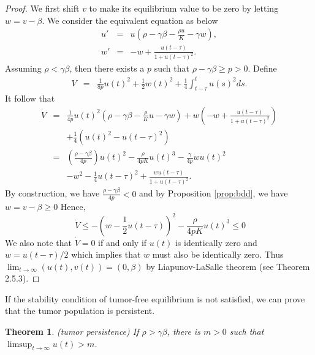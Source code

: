 \documentclass{aims}
\newtheorem{theorem}{Theorem}[section]
\theoremstyle{definition}
\begin{document}
\begin{proof}
We first shift $v$ to make its equilibrium value to be zero by letting $w=v-\beta$. We consider
the equivalent equation as below
\begin{eqnarray*}
u' & = & u(\rho-\gamma\beta-\frac{\rho u}{K}-\gamma w),\\
w' & = & -w+\frac{u(t-\tau)}{1+u(t-\tau)^{2}}.
\end{eqnarray*}
Assuming $\rho<\gamma\beta$, then there exists a $p$ such that  $\rho-\gamma\beta\ge p>0$.
Define 
\begin{eqnarray*}
V & = & \frac{1}{8p}u(t)^{2}+\frac{1}{2}w(t)^{2}+\frac{1}{4}\int_{t-\tau}^{t}u(s)^{2}ds.
\end{eqnarray*}
 It follow that 
\begin{eqnarray*}
\dot{V} & = & \frac{1}{4p}u(t)^{2}(\rho-\gamma\beta-\frac{\rho}{K}u-\gamma w)+w(-w+\frac{u(t-\tau)}{1+u(t-\tau)^{2}})\\
&  & +\frac{1}{4}(u(t)^{2}-u(t-\tau)^{2}) \\
 & = & (\frac{\rho-\gamma\beta}{4p})u(t)^{2} - \frac{\rho}{4pK}u(t)^3 - \frac{\gamma}{4p}wu(t)^2 \\
 &	& -w^2-\frac{1}{4}u(t-\tau)^2+\frac{wu(t-\tau)}{1+u(t-\tau)^2}.
\end{eqnarray*}
By construction, we have $\frac{\rho-\gamma\beta}{4p}<0$ and by Proposition \ref{prop:bdd}, we have $w=v-\beta \ge 0$ Hence, 
\[\
\dot{V} \le -(w-\frac{1}{2}u(t-\tau))^2 - \frac{\rho}{4pK}u(t)^3 \le 0
\]  
We also note that $\dot{V}=0$ if and only if $u(t)$ is identically zero and $w=u(t-\tau)/2$ which implies that $w$ must also be identically zero. Thus $\lim_{t\to\infty}(u(t),v(t))=(0,\beta)$
by Liapunov-LaSalle theorem (see \cite{KuangDDEBook} Theorem 2.5.3). 
\end{proof}
If the stability condition of tumor-free equilibrium is not satisfied,
we can prove that the tumor population is persistent. 
\begin{theorem} \label{thm:delay persistence}
\textup{(tumor persistence)} If $\rho>\gamma\beta$, there is $m>0$
such that \\
 $\limsup_{t\to\infty}u(t)>m$.
\end{theorem}
\end{document}

